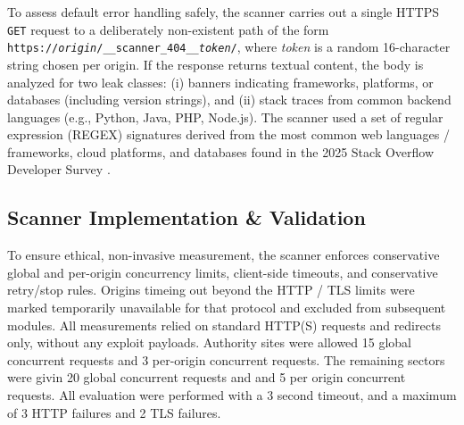 \documentclass[conference]{IEEEtran}
\begin{document}
 
To assess default error handling safely, the scanner carries out a single HTTPS \texttt{GET} request to a deliberately non-existent path of the form 
\texttt{https://\textit{origin}/\_\_scanner\_404\_\_\textit{token}/}, where \textit{token} is a 
random 16-character string chosen per origin. If the response returns textual content, the body is analyzed for two leak classes: (i) banners indicating frameworks, platforms, or
databases (including version strings), and (ii) stack traces from common backend languages (e.g., Python, Java, PHP, Node.js). 
The scanner used a set of regular expression (REGEX) signatures derived from the most common web languages / frameworks, cloud platforms, and databases found in the 
2025 Stack Overflow Developer Survey \cite{stackoverflow_survey_2025}.

\subsection{Scanner Implementation \& Validation}
To ensure ethical, non-invasive measurement, the scanner enforces conservative global and
 per-origin concurrency limits, client-side timeouts, 
 and conservative retry/stop rules. Origins timeing out beyond the HTTP / TLS limits were marked temporarily unavailable for that
protocol and excluded from subsequent modules. All measurements 
 relied on standard HTTP(S) requests and redirects only, without any exploit payloads. Authority sites were
 allowed 15 global concurrent requests and 3 per-origin concurrent requests. The remaining sectors were givin
 20 global concurrent requests and and 5 per origin concurrent requests. All evaluation were performed with a 
 3 second timeout, and a maximum of 3 HTTP failures and 2 TLS failures.
  
\end{document}
